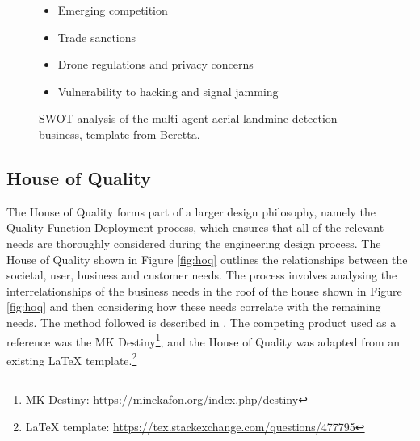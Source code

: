 \begin{figure}[H]
\begin{tcbraster}[raster columns=2, boxrule=0mm, arc=0mm]
\begin{tcolorbox}[equal height group=A, size=fbox, colback=swotT!60, colframe=swotT!80!black, title=\textsc{\textbf{THREATS}}]
\begin{itemize}
    \item Emerging competition
    \item Trade sanctions
    \item Drone regulations and privacy concerns
    \item Vulnerability to hacking and signal jamming
\end{itemize}
\end{tcolorbox}
\end{tcbraster}
\caption[SWOT analysis of the multi-agent aerial landmine detection business]{SWOT analysis of the multi-agent aerial landmine detection business, template from Beretta.}
\label{fig:swot}
\end{figure}


\subsection{House of Quality}
\label{hoq}

The House of Quality forms part of a larger design philosophy, namely the Quality Function Deployment process, which ensures that all of the relevant needs are thoroughly considered during the engineering design process. The House of Quality shown in Figure \ref{fig:hoq} outlines the relationships between the societal, user, business and customer needs. The process involves analysing the interrelationships of the business needs in the roof of the house shown in Figure \ref{fig:hoq} and then considering how these needs correlate with the remaining needs. The method followed is described in \cite{chanqfd}. The competing product used as a reference was the MK Destiny\footnote{MK Destiny: \url{https://minekafon.org/index.php/destiny}}, and the House of Quality was adapted from an existing {\LaTeX} template.\footnote{{\LaTeX} template: \url{https://tex.stackexchange.com/questions/477795}}




